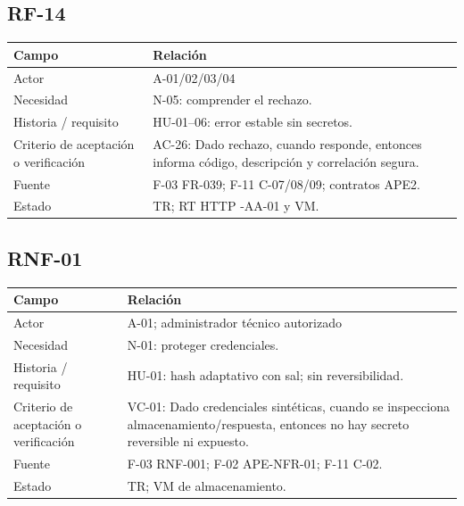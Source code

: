 \documentclass[12pt,a4paper]{report}
\begin{document}
\subsection{RF-14}\label{matriz-RF-14}

{\def\LTcaptype{none} %
\begin{longtable}[]{@{}
  >{\raggedright\arraybackslash}p{}
  >{\raggedright\arraybackslash}p{}@{}}
\toprule\noalign{}
\begin{minipage}[b]{\linewidth}\raggedright
Campo
\end{minipage} & \begin{minipage}[b]{\linewidth}\raggedright
Relación
\end{minipage} \\
\midrule\noalign{}
\endhead
\bottomrule\noalign{}
\endlastfoot
Actor & A-01/02/03/04 \\
Necesidad & N-05: comprender el rechazo. \\
Historia / requisito & HU-01--06: error estable sin secretos. \\
Criterio de aceptación o verificación & AC-26: Dado rechazo, cuando
responde, entonces informa código, descripción y correlación segura. \\
Fuente & F-03 FR-039; F-11 C-07/08/09; contratos APE2. \\
Estado & TR; RT HTTP -AA-01 y VM. \\
\end{longtable}
}

\subsection{RNF-01}\label{matriz-RNF-01}

{\def\LTcaptype{none} %
\begin{longtable}[]{@{}
  >{\raggedright\arraybackslash}p{}
  >{\raggedright\arraybackslash}p{}@{}}
\toprule\noalign{}
\begin{minipage}[b]{\linewidth}\raggedright
Campo
\end{minipage} & \begin{minipage}[b]{\linewidth}\raggedright
Relación
\end{minipage} \\
\midrule\noalign{}
\endhead
\bottomrule\noalign{}
\endlastfoot
Actor & A-01; administrador técnico autorizado \\
Necesidad & N-01: proteger credenciales. \\
Historia / requisito & HU-01: hash adaptativo con sal; sin
reversibilidad. \\
Criterio de aceptación o verificación & VC-01: Dado credenciales
sintéticas, cuando se inspecciona almacenamiento/respuesta, entonces no
hay secreto reversible ni expuesto. \\
Fuente & F-03 RNF-001; F-02 APE-NFR-01; F-11 C-02. \\
Estado & TR; VM de almacenamiento. \\
\end{longtable}
}
\end{document}
